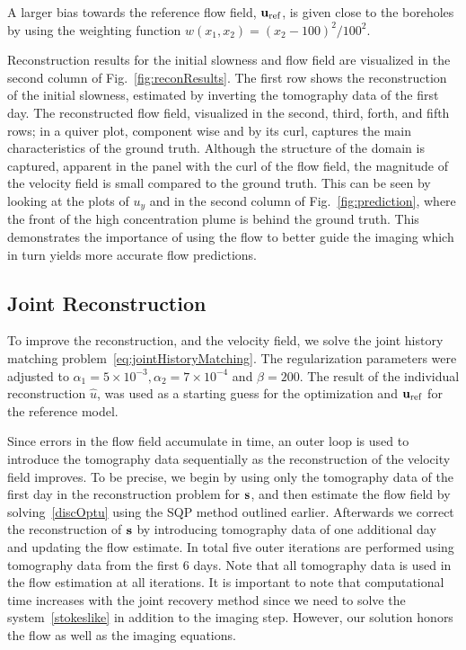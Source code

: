 \documentclass[english]{siamltex}
\newcommand {\buref}   { {\bf u}_{\text{ref}} } 	%
\newcommand {\bfs}   { {\bf s} }
\begin{document}
A larger bias towards the reference flow field, $\buref$, is given  close to the boreholes by using the weighting function $w(x_1,x_2) =(x_2-100)^2/100^2$.

Reconstruction results for the initial slowness and flow field are visualized in the second column of Fig.~\ref{fig:reconResults}. The first row shows the reconstruction of the initial slowness, estimated by inverting the tomography data of the first day. The reconstructed flow field, visualized in the second, third, forth, and fifth rows; in a quiver plot, component wise and by its curl, captures the main characteristics of the ground truth. Although the structure of the domain is captured, apparent in the panel with the curl of the flow field, the magnitude of the velocity field is small compared to the ground truth. This can be seen by looking at the plots of $u_y$ and in the second column of Fig.~\ref{fig:prediction}, where the front of the high concentration plume  is behind the ground truth.  
This demonstrates the importance of using the flow to better guide the imaging which in turn yields more accurate flow predictions.



\subsection{Joint Reconstruction } %
\label{sub:joint_reconstruction_}
To improve the reconstruction, and the velocity field, we solve the joint history matching problem~\eqref{eq:jointHistoryMatching}. The regularization parameters were adjusted to $\alpha_1 =5 \times 10^{-3}, \alpha_2 =7\times 10^{-4}$ and $\beta = 200$. The result of the individual reconstruction $\widehat{u}$, was used as a starting guess for the optimization and $\buref$ for the reference model. 

Since errors in the flow field accumulate in time,  an outer loop is used to introduce the tomography data sequentially as the reconstruction of the velocity field improves. To be precise, we begin by using only the tomography data of the first day in the reconstruction problem for $\bfs$, and then estimate the flow field by solving~\eqref{discOptu} using the SQP method outlined earlier. Afterwards we correct the reconstruction of  $\bfs$ by introducing tomography data of one additional day and updating the flow estimate. In total five outer iterations are performed using tomography data from the first 6 days.  Note that all tomography data is used in the flow estimation at all iterations. 
It is important to note that computational time increases with the joint recovery method since we need to
solve the system~\eqref{stokeslike} in addition to the imaging step. However, our solution honors the flow as well as the imaging  equations. 
\end{document}
